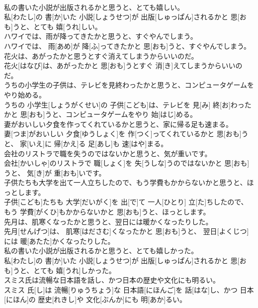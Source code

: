 \documentclass[8pt]{extreport}
\begin{document}
\begin{CJK}{UTF8}{min}
\\	私の書いた小説が出版されるかと思うと、とても嬉しい。	
\\	私[わたし]の 書[か]いた 小説[しょうせつ]が 出版[しゅっぱん]されるかと 思[おも]うと、とても 嬉[うれ]しい。
\\	ハワイでは、雨が降ってきたかと思うと、すぐやんでしまう。	
\\	ハワイでは、 雨[あめ]が 降[ふ]ってきたかと 思[おも]うと、すぐやんでしまう。
\\	花火は、あがったかと思うとすぐ消えてしまうからいいのだ。	
\\	花火[はなび]は、あがったかと 思[おも]うとすぐ 消[き]えてしまうからいいのだ。
\\	うちの小学生の子供は、テレビを見終わったかと思うと、コンピュータゲームをやり始める。	
\\	うちの 小学生[しょうがくせい]の 子供[こども]は、テレビを 見[み] 終[お]わったかと 思[おも]うと、コンピュータゲームをやり 始[はじ]める。
\\	妻がおいしい夕食を作ってくれているかと思うと、家に帰る足も速まる。	
\\	妻[つま]がおいしい 夕食[ゆうしょく]を 作[つく]ってくれているかと 思[おも]うと、 家[いえ]に 帰[かえ]る 足[あし]も 速[はや]まる。
\\	会社のリストラで職を失うのではないかと思うと、気が重いです。	
\\	会社[かいしゃ]のリストラで 職[しょく]を 失[うしな]うのではないかと 思[おも]うと、 気[き]が 重[おも]いです。
\\	子供たちも大学を出て一人立ちしたので、もう学費もかからないかと思うと、ほっとします。	
\\	子供[こども]たちも 大学[だいがく]を 出[で]て 一人[ひとり] 立[た]ちしたので、もう 学費[がくひ]もかからないかと 思[おも]うと、ほっとします。
\\	先月は、肌寒くなったかと思うと、翌日には暖かくなったりした。	
\\	先月[せんげつ]は、 肌寒[はださむ]くなったかと 思[おも]うと、 翌日[よくじつ]には 暖[あたた]かくなったりした。
\\	私の書いた小説が出版されるかと思うと、とても嬉しかった。	
\\	私[わたし]の 書[か]いた 小説[しょうせつ]が 出版[しゅっぱん]されるかと 思[おも]うと、とても 嬉[うれ]しかった。
\\	スミス氏は流暢な日本語を話し、かつ日本の歴史や文化にも明るい。	
\\	スミス 氏[し]は 流暢[りゅうちょう]な 日本語[にほんご]を 話[はな]し、かつ 日本[にほん]の 歴史[れきし]や 文化[ぶんか]にも 明[あか]るい。

\end{CJK}
\end{document}
